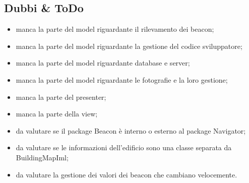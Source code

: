 \documentclass[../SpecificaTecnica.tex]{subfiles}
\begin{document}
	\subsection{Dubbi \& ToDo}
		\begin{itemize}
			\item manca la parte del model riguardante il rilevamento dei beacon;
			\item manca la parte del model riguardante la gestione del codice sviluppatore;
			\item manca la parte del model riguardante database e server;
			\item manca la parte del model riguardante le fotografie e la loro gestione;
			\item manca la parte del presenter;
			\item manca la parte della view;
			\item da valutare se il package Beacon è interno o esterno al package Navigator;
			\item da valutare se le informazioni dell'edificio sono una classe separata da BuildingMapIml;
			\item da valutare la gestione dei valori dei beacon che cambiano velocemente.
		\end{itemize}
\end{document}
